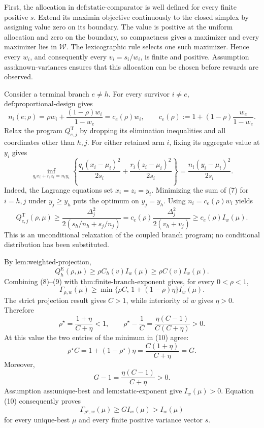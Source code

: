 First, the allocation in \(\text{def:static-comparator}\) is well defined for every finite positive \(s\). Extend its maximin objective continuously to the closed simplex by assigning value zero on its boundary. The value is positive at the uniform allocation and zero on the boundary, so compactness gives a maximizer and every maximizer lies in \(\mathcal W\). The lexicographic rule selects one such maximizer. Hence every \(w_i\), and consequently every \(v_i=s_i/w_i\), is finite and positive. Assumption \(\text{ass:known-variances}\) ensures that this allocation can be chosen before rewards are observed.

Consider a terminal branch \(e\ne h\). For every survivor \(i\ne e\), \(\text{def:proportional-design}\) gives
\[
 n_i(e;\rho)=\rho w_i+\frac{(1-\rho)w_i}{1-w_e}
 =c_e(\rho)w_i,
 \qquad
 c_e(\rho):=1+(1-\rho)\frac{w_e}{1-w_e}. \tag{6}
\]
Relax the program \(Q_{e,j}^{\mathrm T}\) by dropping its elimination inequalities and all coordinates other than \(h,j\). For either retained arm \(i\), fixing its aggregate value at \(y_i\) gives
\[
 \inf_{q_i x_i+r_i z_i=n_i y_i}
 \left\{\frac{q_i(x_i-\mu_i)^2}{2s_i}
 +\frac{r_i(z_i-\mu_i)^2}{2s_i}\right\}
 =\frac{n_i(y_i-\mu_i)^2}{2s_i}. \tag{7}
\]
Indeed, the Lagrange equations set \(x_i=z_i=y_i\). Minimizing the sum of (7) for \(i=h,j\) under \(y_j\geq y_h\) puts the optimum on \(y_j=y_h\). Using \(n_i=c_e(\rho)w_i\) yields
\[
 Q_{e,j}^{\mathrm T}(\rho,\mu)
 \geq \frac{\Delta_j^2}{2(s_h/n_h+s_j/n_j)}
 =c_e(\rho)\frac{\Delta_j^2}{2(v_h+v_j)}
 \geq c_e(\rho)I_w(\mu). \tag{8}
\]
This is an unconditional relaxation of the coupled branch program; no conditional distribution has been substituted.

By \(\text{lem:weighted-projection}\),
\[
 Q_h^{\mathrm E}(\rho,\mu)
 \geq \rho C_h(v)I_w(\mu)
 \geq \rho C(v)I_w(\mu). \tag{9}
\]
Combining (8)--(9) with \(\text{thm:finite-branch-exponent}\) gives, for every \(0<\rho<1\),
\[
 \Gamma_{\rho,w}(\mu)
 \geq \min\{\rho C,\,1+(1-\rho)\eta\}I_w(\mu). \tag{10}
\]
The strict projection result gives \(C>1\), while interiority of \(w\) gives \(\eta>0\). Therefore
\[
 \rho^\star=\frac{1+\eta}{C+\eta}<1,
 \qquad
 \rho^\star-\frac1C
 =\frac{\eta(C-1)}{C(C+\eta)}>0.
\]
At this value the two entries of the minimum in (10) agree:
\[
 \rho^\star C=1+(1-\rho^\star)\eta
 =\frac{C(1+\eta)}{C+\eta}=G.
\]
Moreover,
\[
 G-1=\frac{\eta(C-1)}{C+\eta}>0.
\]
Assumption \(\text{ass:unique-best}\) and \(\text{lem:static-exponent}\) give \(I_w(\mu)>0\). Equation (10) consequently proves
\[
 \Gamma_{\rho^\star,w}(\mu)\geq G I_w(\mu)>I_w(\mu)
\]
for every unique-best \(\mu\) and every finite positive variance vector \(s\).


